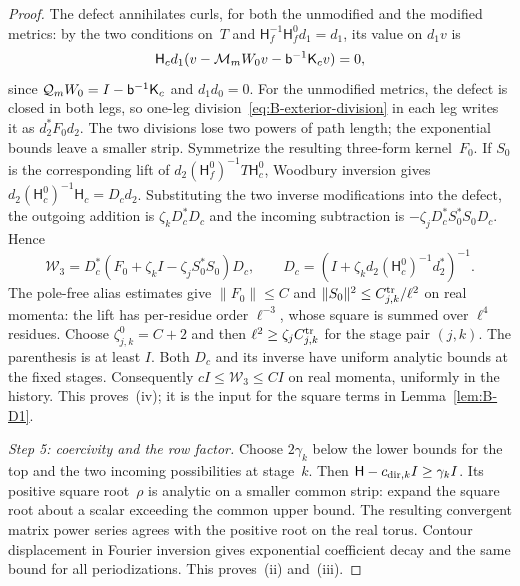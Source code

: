 \begin{proof}
The defect annihilates curls, for both the unmodified and the modified metrics: by the two conditions on~$T$ and $\mathsf H_f^{-1}\mathsf H_f^0d_1=d_1$, its value on $d_1v$ is
\begin{equation*}
\mathsf H_cd_1(v-\mathcal M_mW_0v-\mathsf{b}^{-1}\mathsf K_cv)=0,
\end{equation*}
since $\mathcal Q_mW_0=I-\mathsf{b}^{-1}\mathsf K_c$ and $d_1d_0=0$. For the unmodified metrics, the defect is closed in both legs, so one-leg division~\eqref{eq:B-exterior-division} in each leg writes it as $d_2^*F_0d_2$. The two divisions lose two powers of path length; the exponential bounds leave a smaller strip. Symmetrize the resulting three-form kernel~$F_0$. If $S_0$ is the corresponding lift of $d_2(\mathsf H_f^0)^{-1}T\mathsf H_c^0$, Woodbury inversion gives $d_2(\mathsf H_c^0)^{-1}\mathsf H_c=D_cd_2$. Substituting the two inverse modifications into the defect, the outgoing addition is $\zeta_kD_c^*D_c$ and the incoming subtraction is $-\zeta_jD_c^*S_0^*S_0D_c$. Hence
\begin{equation*}
\mathcal W_3=D_c^*(F_0+\zeta_{k}I-\zeta_jS_0^*S_0)D_c,\qquad
D_c=(I+\zeta_{k}d_2(\mathsf H_c^0)^{-1}d_2^*)^{-1}.
\end{equation*}
The pole-free alias estimates give $\|F_0\|\le C$ and $\|S_0\|^2\le C^{\rm tr}_{j,k}/\ell^2$ on real momenta: the lift has per-residue order $\ell^{-3}$, whose square is summed over $\ell^4$ residues. Choose $\zeta^0_{j,k}=C+2$ and then $\ell^2\ge\zeta_jC^{\rm tr}_{j,k}$ for the stage pair $(j,k)$. The parenthesis is at least $I$. Both $D_c$ and its inverse have uniform analytic bounds at the fixed stages. Consequently $cI\le\mathcal W_3\le CI$ on real momenta, uniformly in the history. This proves~(iv); it is the input for the square terms in Lemma~\ref{lem:B-D1}.

\emph{Step 5: coercivity and the row factor.} Choose $2\gamma_k$ below the lower bounds for the top and the two incoming possibilities at stage~$k$. Then $\mathsf H-c_{{\rm dir},k}I\ge\gamma_kI$. Its positive square root~$\rho$ is analytic on a smaller common strip: expand the square root about a scalar exceeding the common upper bound. The resulting convergent matrix power series agrees with the positive root on the real torus. Contour displacement in Fourier inversion gives exponential coefficient decay and the same bound for all periodizations. This proves~(ii) and~(iii).


\end{proof}
